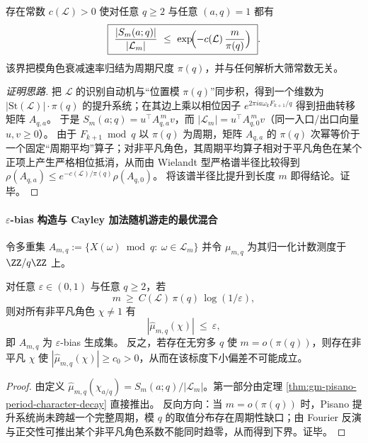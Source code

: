 \begin{theorem}\label{thm:gm-pisano-period-character-decay}
存在常数 \(c(\mathcal{L})>0\) 使对任意 \(q\ge 2\) 与任意 \((a,q)=1\) 都有
\[
\boxed{\ 
\frac{|S_m(a;q)|}{|\mathcal{L}_m|}\ \le\ \exp\!\Bigl(-c(\mathcal{L})\,\frac{m}{\pi(q)}\Bigr)\ }.
\]
该界把模角色衰减速率归结为周期尺度 \(\pi(q)\)，并与任何解析大筛常数无关。
\end{theorem}

\begin{proof}[证明思路]
把 \(\mathcal{L}\) 的识别自动机与“位置模 \(\pi(q)\)”同步积，得到一个维数为 \(|\mathrm{St}(\mathcal{L})|\cdot\pi(q)\) 的提升系统；在其边上乘以相位因子 \(e^{2\pi i a\omega_k F_{k+1}/q}\) 得到扭曲转移矩阵 \(A_{q,a}\)。
于是 \(S_m(a;q)=u^\top A_{q,a}^{\,m}v\)，而 \(|\mathcal{L}_m|=u^\top A_{q,0}^{\,m}v\)（同一入口/出口向量 \(u,v\ge 0\)）。
由于 \(F_{k+1}\bmod q\) 以 \(\pi(q)\) 为周期，矩阵 \(A_{q,a}\) 的 \(\pi(q)\) 次幂等价于一个固定“周期平均”算子；对非平凡角色，其周期平均算子相对于平凡角色在某个正项上产生严格相位抵消，从而由 Wielandt 型严格谱半径比较得到
\(
\rho(A_{q,a})\le e^{-c(\mathcal{L})/\pi(q)}\rho(A_{q,0})
\)。
将该谱半径比提升到长度 \(m\) 即得结论。证毕。
\end{proof}

\paragraph{\texorpdfstring{$\varepsilon$}{epsilon}-bias 构造与 Cayley 加法随机游走的最优混合}
令多重集
\(
A_{m,q}:=\{X(\omega)\bmod q:\ \omega\in\mathcal{L}_m\}
\)
并令 \(\mu_{m,q}\) 为其归一化计数测度于 \(\ZZ/q\ZZ\) 上。

\begin{proposition}\label{prop:gm-epsilon-bias-pisano-scale}
对任意 \(\varepsilon\in(0,1)\) 与任意 \(q\ge 2\)，若
\[
m\ \ge\ C(\mathcal{L})\,\pi(q)\,\log(1/\varepsilon),
\]
则对所有非平凡角色 \(\chi\neq 1\) 有
\[
|\widehat\mu_{m,q}(\chi)|\ \le\ \varepsilon,
\]
即 \(A_{m,q}\) 为 \(\varepsilon\)-bias 生成集。
反之，若存在无穷多 \(q\) 使 \(m=o(\pi(q))\)，则存在非平凡 \(\chi\) 使 \(|\widehat\mu_{m,q}(\chi)|\ge c_0>0\)，从而在该标度下小偏差不可能成立。
\end{proposition}

\begin{proof}
由定义 \(\widehat\mu_{m,q}(\chi_{a/q})=S_m(a;q)/|\mathcal{L}_m|\)。第一部分由定理 \ref{thm:gm-pisano-period-character-decay} 直接推出。
反向方向：当 \(m=o(\pi(q))\) 时，Pisano 提升系统尚未跨越一个完整周期，模 \(q\) 的取值分布存在周期性缺口；由 Fourier 反演与正交性可推出某个非平凡角色系数不能同时趋零，从而得到下界。证毕。
\end{proof}

